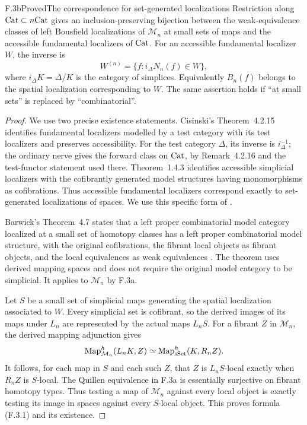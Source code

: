 \begin{claim}{F.3b}{Proved}{The correspondence for set-generated localizations}
Restriction along $\mathrm{Cat}\subset n\mathrm{Cat}$ gives an
inclusion-preserving bijection between the weak-equivalence classes
of left Bousfield localizations of $\mathcal M_n$ at small sets of
maps and the accessible fundamental localizers of $\mathrm{Cat}$.
For an accessible fundamental localizer $W$, the inverse is
\[
 W^{(n)}=\{f:i_\Delta N_n(f)\in W\},                 \tag{F.3.1}
\]
where $i_\Delta K=\Delta/K$ is the category of simplices.
Equivalently $B_n(f)$ belongs to the spatial localization
corresponding to $W$. The same assertion holds if ``at small sets''
is replaced by ``combinatorial''.
\end{claim}
\begin{proof}
We use two precise existence statements. Cisinski's
Theorem~4.2.15 identifies fundamental localizers modelled by a test
category with its test localizers and preserves accessibility.
For the test category $\Delta$, its inverse is $i_\Delta^{-1}$;
the ordinary nerve gives the forward class on $\mathrm{Cat}$, by
Remark~4.2.16 and the test-functor statement used there.
Theorem~1.4.3 identifies accessible simplicial localizers with the
cofibrantly generated model structures having monomorphisms as
cofibrations. Thus accessible fundamental localizers correspond
exactly to set-generated localizations of spaces. We use this
specific form of \cite{I_Cisinski2006}.

Barwick's Theorem~4.7 states that a left proper combinatorial model
category localized at a small set of homotopy classes has a left
proper combinatorial model structure, with the original
cofibrations, the fibrant local objects as fibrant objects, and the
local equivalences as weak equivalences \cite{I_Barwick2010}.
The theorem uses derived mapping spaces and does not require the
original model category to be simplicial. It applies to $\mathcal M_n$
by F.3a.

Let $S$ be a small set of simplicial maps generating the spatial
localization associated to $W$. Every simplicial set is cofibrant,
so the derived images of its maps under $L_n$ are represented by
the actual maps $L_nS$. For a fibrant $Z$ in $\mathcal M_n$,
the derived mapping adjunction gives
\[
 \operatorname{Map}^h_{\mathcal M_n}(L_nK,Z)
       \simeq\operatorname{Map}^h_{\mathrm{sSet}}(K,R_nZ).
\]
It follows, for each map in $S$ and each such $Z$, that $Z$ is
$L_nS$-local exactly when $R_nZ$ is $S$-local. The Quillen
equivalence in F.3a is essentially surjective on fibrant homotopy
types. Thus testing a map of $\mathcal M_n$ against every local
object is exactly testing its image in spaces against every
$S$-local object. This proves formula (F.3.1) and its existence.


\end{proof}
